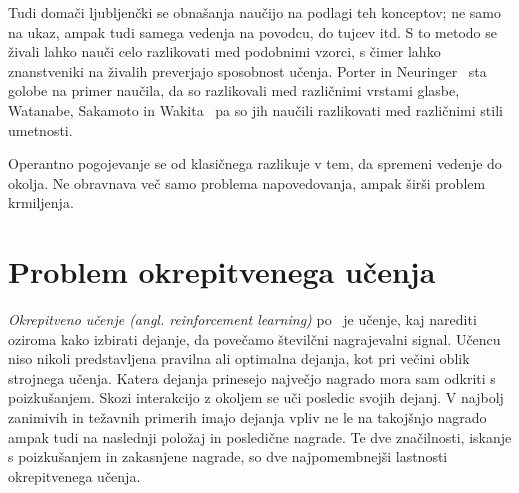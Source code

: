 \documentclass[a4paper, oneside, 12pt]{report}
\begin{document}
Tudi domači ljubljenčki se obnašanja naučijo na podlagi teh konceptov; ne samo na ukaz, ampak tudi samega vedenja na povodcu, do tujcev itd. S to metodo se živali lahko nauči celo razlikovati med podobnimi vzorci, s čimer lahko znanstveniki na živalih preverjajo sposobnost učenja. Porter in Neuringer~\cite{MusicDiscriminationByPigeons} sta golobe na primer naučila, da so razlikovali med različnimi vrstami glasbe, Watanabe, Sakamoto in Wakita~\cite{PigeonsDiscriminationOfPaintings} pa so jih naučili razlikovati med različnimi stili umetnosti.

Operantno pogojevanje se od klasičnega razlikuje v tem, da spremeni vedenje do okolja. Ne obravnava več samo problema napovedovanja, ampak širši problem krmiljenja.

\chapter{Problem okrepitvenega učenja} \label{chapter:Problem}
\thispagestyle{fancy}
{\em Okrepitveno učenje (angl. reinforcement learning)} po~\cite{ReinforcementLearningAnIntroduction} je učenje, kaj narediti oziroma kako izbirati dejanje, da povečamo številčni nagrajevalni signal. Učencu niso nikoli predstavljena pravilna ali optimalna dejanja, kot pri večini oblik strojnega učenja. Katera dejanja prinesejo največjo nagrado mora sam odkriti s poizkušanjem. Skozi interakcijo z okoljem se uči posledic svojih dejanj. V najbolj zanimivih in težavnih primerih imajo dejanja vpliv ne le na takojšnjo nagrado ampak tudi na naslednji položaj in posledične nagrade. Te dve značilnosti, iskanje s poizkušanjem in zakasnjene nagrade, so dve najpomembnejši lastnosti okrepitvenega učenja.

\end{document}
